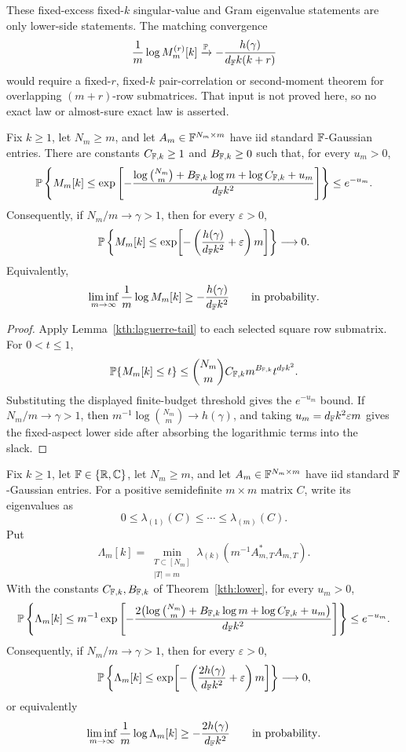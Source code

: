 \begin{remark}
These fixed-excess fixed-\(k\) singular-value and Gram eigenvalue statements are
only lower-side statements.  The matching convergence
\[
  \frac1m\log M_m^{(r)}[k]
  \xrightarrow{\mathbb{P}}
  -\frac{h(\gamma)}{d_{\mathbb{F}} k(k+r)}
\]
would require a fixed-\(r\), fixed-\(k\) pair-correlation or second-moment
theorem for overlapping \((m+r)\)-row submatrices.  That input is not proved
here, so no exact law or almost-sure exact law is asserted.
\end{remark}

\begin{theorem}\label{kth:lower}
Fix \(k\ge1\), let \(N_m\ge m\), and let \(A_m\in\mathbb{F}^{N_m\times m}\) have iid
standard \(\mathbb{F}\)-Gaussian entries.  There are constants
\(C_{\mathbb{F},k}\ge1\) and \(B_{\mathbb{F},k}\ge0\) such that, for every \(u_m>0\),
\[
  \mathbb{P}\left\{
  M_m[k]\le
  \exp\left[-\frac{\log\binom{N_m}{m}+B_{\mathbb{F},k}\log m+\log C_{\mathbb{F},k}+u_m}
  {d_{\mathbb{F}} k^2}\right]\right\}
  \le e^{-u_m}.
\]
Consequently, if \(N_m/m\to\gamma>1\), then for every \(\varepsilon>0\),
\[
  \mathbb{P}\left\{M_m[k]\le
     \exp\!\left[-\left(\frac{h(\gamma)}{d_{\mathbb{F}} k^2}+\varepsilon\right)m\right]\right\}
  \longrightarrow0.
\]
Equivalently,
\[
  \liminf_{m\to\infty}\frac1m\log M_m[k]
  \ge -\frac{h(\gamma)}{d_{\mathbb{F}} k^2}
  \qquad\hbox{in probability}.
\]
\end{theorem}

\begin{proof}
Apply Lemma~\ref{kth:laguerre-tail} to each selected square row submatrix.  For
\(0<t\le1\),
\[
  \mathbb{P}\{M_m[k]\le t\}
  \le \binom{N_m}{m}C_{\mathbb{F},k}m^{B_{\mathbb{F},k}}t^{d_{\mathbb{F}} k^2}.
\]
Substituting the displayed finite-budget threshold gives the \(e^{-u_m}\) bound.
If \(N_m/m\to\gamma>1\), then
\(m^{-1}\log\binom{N_m}{m}\to h(\gamma)\), and taking
\(u_m=d_{\mathbb{F}} k^2\varepsilon m\) gives the fixed-aspect lower side after absorbing
the logarithmic terms into the slack.
\end{proof}

\begin{corollary}\label{kth:gram-lower}
Fix \(k\ge1\), let \(\mathbb{F}\in\{\mathbb{R},\mathbb{C}\}\), let \(N_m\ge m\), and let
\(A_m\in\mathbb{F}^{N_m\times m}\) have iid standard \(\mathbb{F}\)-Gaussian entries.  For a
positive semidefinite \(m\times m\) matrix \(C\), write its eigenvalues as
\[
  0\le\lambda_{(1)}(C)\le\cdots\le\lambda_{(m)}(C).
\]
Put
\[
  \Lambda_m[k]
  =
  \min_{\substack{T\subset[N_m]\\ |T|=m}}
  \lambda_{(k)}\!\left(m^{-1}A_{m,T}^*A_{m,T}\right).
\]
With the constants \(C_{\mathbb{F},k},B_{\mathbb{F},k}\) of Theorem~\ref{kth:lower}, for every
\(u_m>0\),
\[
  \mathbb{P}\left\{
  \Lambda_m[k]\le
  m^{-1}\exp\left[
  -\frac{2\bigl(\log\binom{N_m}{m}+B_{\mathbb{F},k}\log m+\log C_{\mathbb{F},k}+u_m\bigr)}
  {d_{\mathbb{F}} k^2}\right]\right\}
  \le e^{-u_m}.
\]
Consequently, if \(N_m/m\to\gamma>1\), then for every \(\varepsilon>0\),
\[
  \mathbb{P}\left\{\Lambda_m[k]\le
     \exp\!\left[-\left(\frac{2h(\gamma)}{d_{\mathbb{F}} k^2}+\varepsilon\right)m\right]\right\}
  \longrightarrow0,
\]
or equivalently
\[
  \liminf_{m\to\infty}\frac1m\log\Lambda_m[k]
  \ge -\frac{2h(\gamma)}{d_{\mathbb{F}} k^2}
  \qquad\hbox{in probability}.
\]
\end{corollary}

